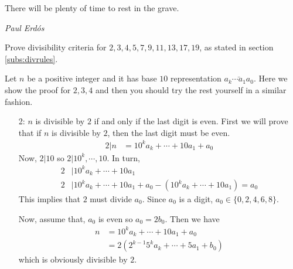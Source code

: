 \documentclass[problems.tex]{subfile}
\begin{document}
	\epigraph{There will be plenty of time to rest in the grave.}{\textit{Paul Erd\'{o}s}}
	

	\begin{problem}
		Prove divisibility criteria for $2,3,4,5,7,9,11,13,17,19$, as stated in section \eqref{subs:divrules}\watermark.
	\end{problem}
	
	\begin{solution}
		Let $n$ be a positive integer and it has base $10$ representation $\bar{a_k\cdots a_1a_0}$. Here we show the proof for $2,3,4$ and then you should try the rest yourself in a similar fashion.
			\begin{enumerate}
				\item[2:] $n$ is divisible by $2$ if and only if the last digit is even. First we will prove that if $n$ is divisible by $2$, then the last digit must be even.
						\begin{align*}
							2|n & = 10^ka_k+\cdots+10a_1+a_0
						\end{align*}
					Now, $2|10$ so $2|10^k,\cdots,10$. In turn,
						\begin{align*}
							2 & |10^ka_k+\cdots+10a_1\\
							2 & |10^ka_k+\cdots+10a_1+a_0-(10^ka_k+\cdots+10a_1)=a_0
						\end{align*}
					This implies that $2$ must divide $a_0$. Since $a_0$ is a digit, $a_0\in\{0,2,4,6,8\}$.
					
					Now, assume that, $a_0$ is even so $a_0=2b_0$. Then we have
						\begin{align*}
							n & = 10^ka_k+\cdots+10a_1+a_0\\
							  & = 2(2^{k-1}5^ka_k+\cdots+5a_1+b_0)
						\end{align*}
					which is obviously divisible by $2$.
					

\end{enumerate}
\end{solution}
\end{document}
